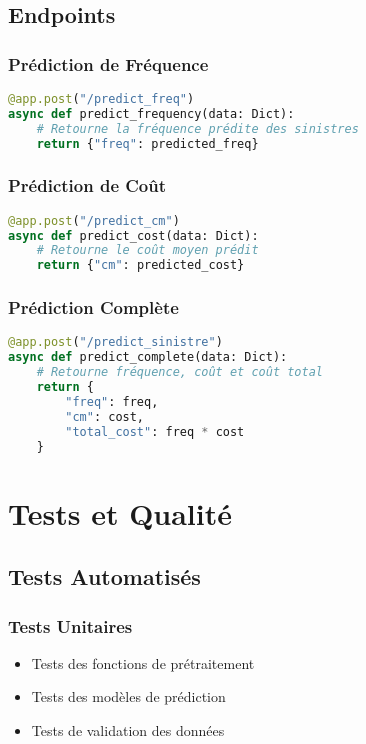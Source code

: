 \documentclass[12pt,a4paper]{report}
\begin{document}
\section{Endpoints}
\subsection{Prédiction de Fréquence}
\begin{lstlisting}[language=python]
@app.post("/predict_freq")
async def predict_frequency(data: Dict):
    # Retourne la fréquence prédite des sinistres
    return {"freq": predicted_freq}
\end{lstlisting}

\subsection{Prédiction de Coût}
\begin{lstlisting}[language=python]
@app.post("/predict_cm")
async def predict_cost(data: Dict):
    # Retourne le coût moyen prédit
    return {"cm": predicted_cost}
\end{lstlisting}

\subsection{Prédiction Complète}
\begin{lstlisting}[language=python]
@app.post("/predict_sinistre")
async def predict_complete(data: Dict):
    # Retourne fréquence, coût et coût total
    return {
        "freq": freq,
        "cm": cost,
        "total_cost": freq * cost
    }
\end{lstlisting}

\chapter{Tests et Qualité}
\section{Tests Automatisés}
\subsection{Tests Unitaires}
\begin{itemize}
    \item Tests des fonctions de prétraitement
    \item Tests des modèles de prédiction
    \item Tests de validation des données
\end{itemize}
\end{document}
